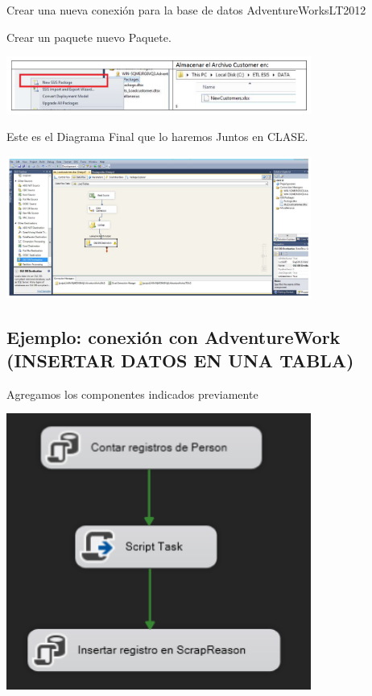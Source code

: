 \documentclass[12pt,letterpaper]{article}
\begin{document}
Crear una nueva conexión para la base de datos AdventureWorksLT2012

Crear un paquete nuevo Paquete.

\begin{center}
    \includegraphics[width=10cm]{./img/img31.png}
\end{center}

Este es el Diagrama Final que lo haremos Juntos en CLASE.

\begin{center}
    \includegraphics[width=10cm]{./img/img32.png}
\end{center}

\subsection{Ejemplo: conexión con AdventureWork (INSERTAR DATOS EN UNA TABLA)}

Agregamos los componentes indicados previamente

\begin{center}
    \includegraphics[width=10cm]{./img/img33.png}
\end{center}
\end{document}
